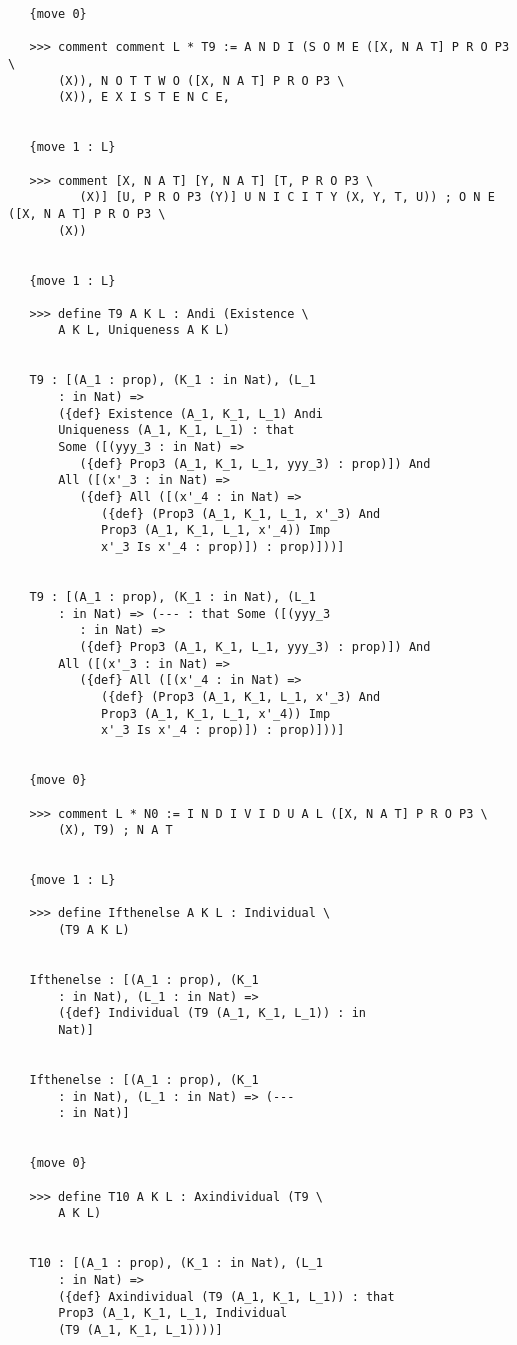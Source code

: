 \documentclass{article}
\begin{document}
\begin{verbatim}
   {move 0}

   >>> comment comment L * T9 := A N D I (S O M E ([X, N A T] P R O P3 \
       (X)), N O T T W O ([X, N A T] P R O P3 \
       (X)), E X I S T E N C E,


   {move 1 : L}

   >>> comment [X, N A T] [Y, N A T] [T, P R O P3 \
          (X)] [U, P R O P3 (Y)] U N I C I T Y (X, Y, T, U)) ; O N E ([X, N A T] P R O P3 \
       (X))


   {move 1 : L}

   >>> define T9 A K L : Andi (Existence \
       A K L, Uniqueness A K L)


   T9 : [(A_1 : prop), (K_1 : in Nat), (L_1 
       : in Nat) => 
       ({def} Existence (A_1, K_1, L_1) Andi 
       Uniqueness (A_1, K_1, L_1) : that 
       Some ([(yyy_3 : in Nat) => 
          ({def} Prop3 (A_1, K_1, L_1, yyy_3) : prop)]) And 
       All ([(x'_3 : in Nat) => 
          ({def} All ([(x'_4 : in Nat) => 
             ({def} (Prop3 (A_1, K_1, L_1, x'_3) And 
             Prop3 (A_1, K_1, L_1, x'_4)) Imp 
             x'_3 Is x'_4 : prop)]) : prop)]))]


   T9 : [(A_1 : prop), (K_1 : in Nat), (L_1 
       : in Nat) => (--- : that Some ([(yyy_3 
          : in Nat) => 
          ({def} Prop3 (A_1, K_1, L_1, yyy_3) : prop)]) And 
       All ([(x'_3 : in Nat) => 
          ({def} All ([(x'_4 : in Nat) => 
             ({def} (Prop3 (A_1, K_1, L_1, x'_3) And 
             Prop3 (A_1, K_1, L_1, x'_4)) Imp 
             x'_3 Is x'_4 : prop)]) : prop)]))]


   {move 0}

   >>> comment L * N0 := I N D I V I D U A L ([X, N A T] P R O P3 \
       (X), T9) ; N A T


   {move 1 : L}

   >>> define Ifthenelse A K L : Individual \
       (T9 A K L)


   Ifthenelse : [(A_1 : prop), (K_1 
       : in Nat), (L_1 : in Nat) => 
       ({def} Individual (T9 (A_1, K_1, L_1)) : in 
       Nat)]


   Ifthenelse : [(A_1 : prop), (K_1 
       : in Nat), (L_1 : in Nat) => (--- 
       : in Nat)]


   {move 0}

   >>> define T10 A K L : Axindividual (T9 \
       A K L)


   T10 : [(A_1 : prop), (K_1 : in Nat), (L_1 
       : in Nat) => 
       ({def} Axindividual (T9 (A_1, K_1, L_1)) : that 
       Prop3 (A_1, K_1, L_1, Individual 
       (T9 (A_1, K_1, L_1))))]



\end{verbatim}
\end{document}
